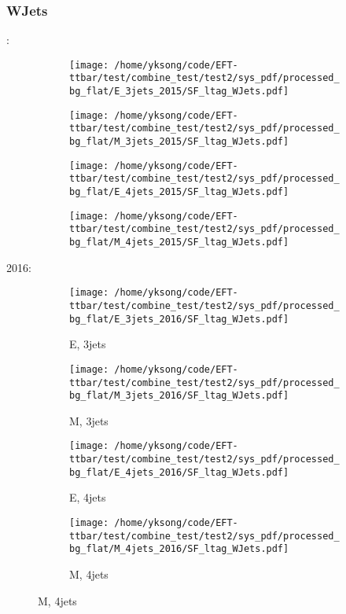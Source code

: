\documentclass{beamer}
\begin{document}
\begin{frame}
\frametitle{WJets}
\fontsize{5}{1}:
\begin{figure}
\centering
\begin{subfigure}[b]{0.24\textwidth}
\texttt{[image: /home/yksong/code/EFT-ttbar/test/combine\_test/test2/sys\_pdf/processed\_bg\_flat/E\_3jets\_2015/SF\_ltag\_WJets.pdf]}
\end{subfigure}
\begin{subfigure}[b]{0.24\textwidth}
\texttt{[image: /home/yksong/code/EFT-ttbar/test/combine\_test/test2/sys\_pdf/processed\_bg\_flat/M\_3jets\_2015/SF\_ltag\_WJets.pdf]}
\end{subfigure}
\begin{subfigure}[b]{0.24\textwidth}
\texttt{[image: /home/yksong/code/EFT-ttbar/test/combine\_test/test2/sys\_pdf/processed\_bg\_flat/E\_4jets\_2015/SF\_ltag\_WJets.pdf]}
\end{subfigure}
\begin{subfigure}[b]{0.24\textwidth}
\texttt{[image: /home/yksong/code/EFT-ttbar/test/combine\_test/test2/sys\_pdf/processed\_bg\_flat/M\_4jets\_2015/SF\_ltag\_WJets.pdf]}
\end{subfigure}
\end{figure}
2016:
\begin{figure}
\centering
\begin{subfigure}[b]{0.24\textwidth}
\texttt{[image: /home/yksong/code/EFT-ttbar/test/combine\_test/test2/sys\_pdf/processed\_bg\_flat/E\_3jets\_2016/SF\_ltag\_WJets.pdf]}
\captionsetup{font=tiny}
\caption{E, 3jets}
\end{subfigure}
\begin{subfigure}[b]{0.24\textwidth}
\texttt{[image: /home/yksong/code/EFT-ttbar/test/combine\_test/test2/sys\_pdf/processed\_bg\_flat/M\_3jets\_2016/SF\_ltag\_WJets.pdf]}
\captionsetup{font=tiny}
\caption{M, 3jets}
\end{subfigure}
\begin{subfigure}[b]{0.24\textwidth}
\texttt{[image: /home/yksong/code/EFT-ttbar/test/combine\_test/test2/sys\_pdf/processed\_bg\_flat/E\_4jets\_2016/SF\_ltag\_WJets.pdf]}
\captionsetup{font=tiny}
\caption{E, 4jets}
\end{subfigure}
\begin{subfigure}[b]{0.24\textwidth}
\texttt{[image: /home/yksong/code/EFT-ttbar/test/combine\_test/test2/sys\_pdf/processed\_bg\_flat/M\_4jets\_2016/SF\_ltag\_WJets.pdf]}
\captionsetup{font=tiny}
\caption{M, 4jets}
\end{subfigure}
\end{figure}
\end{frame}
\end{document}
